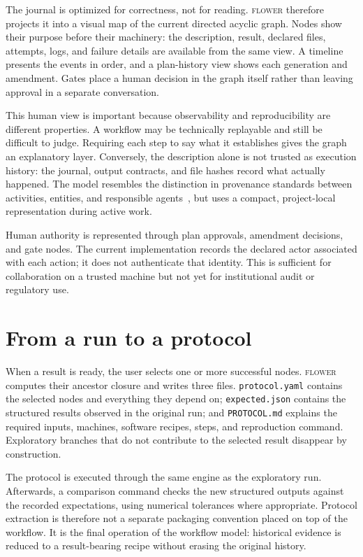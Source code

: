 \documentclass[10pt]{article}
\newcommand{\flower}{\textsc{flower}}
\begin{document}
The journal is optimized for correctness, not for reading. \flower{} therefore projects it into a visual map of
the current directed acyclic graph. Nodes show their purpose before their machinery: the description, result,
declared files, attempts, logs, and failure details are available from the same view. A timeline presents the
events in order, and a plan-history view shows each generation and amendment. Gates place a human decision in
the graph itself rather than leaving approval in a separate conversation.

This human view is important because observability and reproducibility are different properties. A workflow
may be technically replayable and still be difficult to judge. Requiring each step to say what it establishes
gives the graph an explanatory layer. Conversely, the description alone is not trusted as execution history:
the journal, output contracts, and file hashes record what actually happened. The model resembles the
distinction in provenance standards between activities, entities, and responsible agents~\cite{w3cprov}, but
uses a compact, project-local representation during active work.

Human authority is represented through plan approvals, amendment decisions, and gate nodes. The current
implementation records the declared actor associated with each action; it does not authenticate that identity.
This is sufficient for collaboration on a trusted machine but not yet for institutional audit or regulatory
use.

\section{From a run to a protocol}

When a result is ready, the user selects one or more successful nodes. \flower{} computes their ancestor closure
and writes three files. \texttt{protocol.yaml} contains the selected nodes and everything they depend on;
\texttt{expected.json} contains the structured results observed in the original run; and
\texttt{PROTOCOL.md} explains the required inputs, machines, software recipes, steps, and reproduction command.
Exploratory branches that do not contribute to the selected result disappear by construction.

The protocol is executed through the same engine as the exploratory run. Afterwards, a comparison command
checks the new structured outputs against the recorded expectations, using numerical tolerances where
appropriate. Protocol extraction is therefore not a separate packaging convention placed on top of the
workflow. It is the final operation of the workflow model: historical evidence is reduced to a result-bearing
recipe without erasing the original history.
\end{document}

